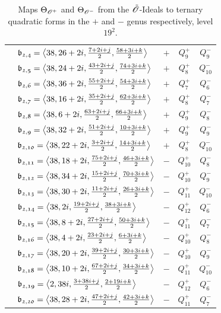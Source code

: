 \begin{table}
\begin{tabular}{|c|l|c|c|c|}
 & $\id{b_{2,4}}=\<38,26+2i,\frac{7+2i+j}{2},\frac{58+3i+k}{2}>$ & $+$ & $Q_{9}^{+}$ & $Q_{9}^{-}$\\
 & $\id{b_{2,5}}=\<38,24+2i,\frac{43+2i+j}{2},\frac{74+3i+k}{2}>$ & $+$ & $Q_{8}^{+}$ & $Q_{10}^{-}$\\
 & $\id{b_{2,6}}=\<38,36+2i,\frac{55+2i+j}{2},\frac{54+3i+k}{2}>$ & $+$ & $Q_{7}^{+}$ & $Q_{6}^{-}$\\
 & $\id{b_{2,7}}=\<38,16+2i,\frac{35+2i+j}{2},\frac{62+3i+k}{2}>$ & $+$ & $Q_{8}^{+}$ & $Q_{7}^{-}$\\
 & $\id{b_{2,8}}=\<38,6+2i,\frac{63+2i+j}{2},\frac{66+3i+k}{2}>$ & $+$ & $Q_{9}^{+}$ & $Q_{8}^{-}$\\
 & $\id{b_{2,9}}=\<38,32+2i,\frac{51+2i+j}{2},\frac{10+3i+k}{2}>$ & $+$ & $Q_{9}^{+}$ & $Q_{9}^{-}$\\
 & $\id{b_{2,10}}=\<38,22+2i,\frac{3+2i+j}{2},\frac{14+3i+k}{2}>$ & $+$ & $Q_{8}^{+}$ & $Q_{10}^{-}$\\
 & $\id{b_{2,11}}=\<38,18+2i,\frac{75+2i+j}{2},\frac{46+3i+k}{2}>$ & $-$ & $Q_{10}^{+}$ & $Q_{8}^{-}$\\
 & $\id{b_{2,12}}=\<38,34+2i,\frac{15+2i+j}{2},\frac{70+3i+k}{2}>$ & $-$ & $Q_{10}^{+}$ & $Q_{9}^{-}$\\
 & $\id{b_{2,13}}=\<38,30+2i,\frac{11+2i+j}{2},\frac{26+3i+k}{2}>$ & $-$ & $Q_{11}^{+}$ & $Q_{10}^{-}$\\
 & $\id{b_{2,14}}=\<38,2i,\frac{19+2i+j}{2},\frac{38+3i+k}{2}>$ & $-$ & $Q_{12}^{+}$ & $Q_{6}^{-}$\\
 & $\id{b_{2,15}}=\<38,8+2i,\frac{27+2i+j}{2},\frac{50+3i+k}{2}>$ & $-$ & $Q_{11}^{+}$ & $Q_{7}^{-}$\\
 & $\id{b_{2,16}}=\<38,4+2i,\frac{23+2i+j}{2},\frac{6+3i+k}{2}>$ & $-$ & $Q_{10}^{+}$ & $Q_{8}^{-}$\\
 & $\id{b_{2,17}}=\<38,20+2i,\frac{39+2i+j}{2},\frac{30+3i+k}{2}>$ & $-$ & $Q_{10}^{+}$ & $Q_{9}^{-}$\\
 & $\id{b_{2,18}}=\<38,10+2i,\frac{67+2i+j}{2},\frac{34+3i+k}{2}>$ & $-$ & $Q_{11}^{+}$ & $Q_{10}^{-}$\\
 & $\id{b_{2,19}}=\<2,38i,\frac{3+38i+j}{2},\frac{2+19i+k}{2}>$ & $-$ & $Q_{12}^{+}$ & $Q_{6}^{-}$\\
 & $\id{b_{2,20}}=\<38,28+2i,\frac{47+2i+j}{2},\frac{42+3i+k}{2}>$ & $-$ & $Q_{11}^{+}$ & $Q_{7}^{-}$\\
\hline
\end{tabular}
\caption{Maps ${\Theta}_{{{\mathscr{O}}^+}}$ and ${\Theta}_{{{\mathscr{O}}^-}}$ from the ${\tilde{{\mathscr{O}}}}$-Ideals
to ternary quadratic forms in the $+$ and $-$ genus respectively, level $19^2$.
          \label{table:psi:19}}
\end{table}
